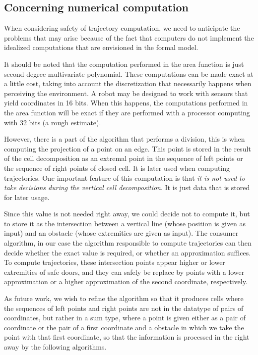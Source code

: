 \documentclass[a4paper, USenglish, cleveref, autoref, thm-restate]{lipics-v2021}
\begin{document}
\subsection{Concerning numerical computation}
When considering safety of trajectory computation, we need to
anticipate the problems that may arise because of the fact that
computers do not implement the idealized computations that are
envisioned in the formal model.

It should be noted that the computation performed in the area function
is just second-degree multivariate polynomial.  These computations can
be made exact at a little cost, taking into account the discretization
that necessarily happens when perceiving the environment.  A robot may
be designed to work with sensors that yield coordinates in 16 bits.
When this happens, the computations performed in the area function
will be exact if they are performed with a processor computing with 32
bits (a rough estimate).

However, there is a part of the algorithm that performs a division,
this is when computing the projection of a point on an edge.  This
point is stored in the result of the cell decomposition as an extremal
point in the sequence of left points or the sequence of right points
of closed cell.  It is later used when computing trajectories.  One
important feature of this computation is that {\em it is not used to
  take decisions during the vertical cell decomposition}.  It is just
data that is stored for later usage.

Since this value is not needed right away, we could decide not to
compute it, but to store it as the intersection between a vertical
line (whose position is given as input) and an obstacle (whose
extremities are given as input).  The consumer algorithm, in our case
the algorithm responsible to compute trajectories can then decide
whether the exact value is required, or whether an approximation
suffices.  To compute trajectories, these intersection points appear
higher or lower extremities of safe doors, and they can safely be
replace by points with a lower approximation or a higher approximation
of the second coordinate, respectively.

As future work, we wish to refine the algorithm so that it produces
cells where the sequences of left points and right points are not in
the datatype of pairs of coordinates, but rather in a sum type, where
a point is given either as a pair of coordinate or the pair of a first
coordinate and a obstacle in which we take the point with that first
coordinate, so that the information is processed in the right away by
the following algorithms.
\end{document}
